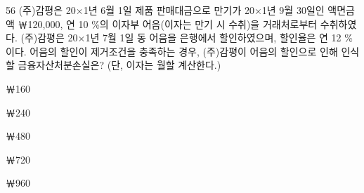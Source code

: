 \begin{question}{56}
(주)감평은 20×1년 6월 1일 제품 판매대금으로 만기가 20×1년 9월 30일인 액면금액 ￦120,000, 연 10 \%의 이자부 어음(이자는 만기 시 수취)을 거래처로부터 수취하였다. (주)감평은 20×1년 7월 1일 동 어음을 은행에서 할인하였으며, 할인율은 연 12 \%이다. 어음의 할인이 제거조건을 충족하는 경우, (주)감평이 어음의 할인으로 인해 인식할 금융자산처분손실은? (단, 이자는 월할 계산한다.)
\begin{choices}
  \item ￦160
  \item ￦240
  \item ￦480
  \item ￦720
  \item ￦960
\end{choices}
\end{question}

